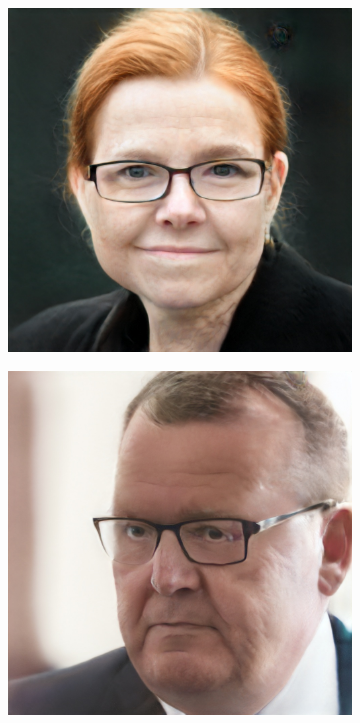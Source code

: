 \begin{figure}
    \begin{subfigure}[b]{0.24\textwidth}
        \includegraphics[width=\textwidth]{fig/stylegan/faceedit/inger-glasses}
    \end{subfigure}
    \begin{subfigure}[b]{0.24\textwidth}
        \includegraphics[width=\textwidth]{fig/stylegan/faceedit/lars-glasses}

\end{subfigure}
\end{figure}

